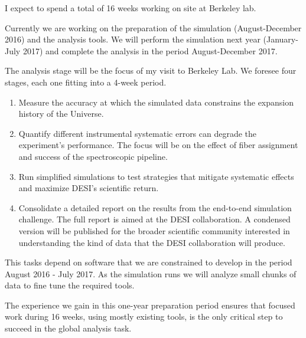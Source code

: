 \documentclass[12pt]{article}
\begin{document}
I expect to spend a total of 16 weeks working on site at Berkeley
lab. 

Currently we are working on the preparation of the simulation
(August-December 2016) and the analysis tools. We will  perform the
simulation next year (January-July 2017) and complete the analysis in
the period August-December 2017.  

The analysis stage will be the focus of my visit
to Berkeley Lab.
We foresee four stages, each one fitting into a 4-week period.

\begin{enumerate}
\item Measure the accuracy at which the simulated data constrains the
  expansion history of the Universe.  
\item Quantify different instrumental systematic errors can degrade
  the experiment's performance. The focus will be on the effect of
  fiber assignment and success of the spectroscopic pipeline. 
\item Run simplified simulations to test strategies that mitigate
  systematic effects and maximize DESI's scientific return.
\item Consolidate a detailed report on the results from the end-to-end
  simulation challenge. 
  The full report is aimed at the DESI collaboration. A condensed
  version will be published for the broader scientific community
  interested in understanding the kind of data that the DESI
  collaboration will produce. 
\end{enumerate}

This tasks depend on software that we are constrained to develop in
the period August 2016 - July 2017. As the simulation runs we will
analyze small chunks of data to fine tune the required tools. 

The experience we gain in this one-year preparation period ensures that
focused work during 16 weeks, using mostly existing tools, is the only
critical step to succeed in the global analysis task.
\end{document}
